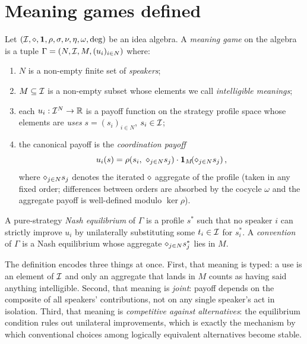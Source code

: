 \section{Meaning games defined}\label{sec:meaning-game-defined}

\begin{definition}\label{def:meaning-game}
Let $(\mathcal{I},\mathbin{\diamond},\mathbf{1},\rho,\sigma,\nu,\eta,\omega,\deg)$ be an
idea algebra. A \emph{meaning game} on the algebra is a tuple
$\Gamma=(N,\mathcal{I},M,(u_i)_{i\in N})$ where:
\begin{enumerate}[leftmargin=2em]
  \item $N$ is a non-empty finite set of \emph{speakers};
  \item $M\subseteq\mathcal{I}$ is a non-empty subset whose elements we call
    \emph{intelligible meanings};
  \item each $u_i:\mathcal{I}^N\to\mathbb{R}$ is a payoff function on the strategy
    profile space whose elements are \emph{uses} $s=(s_i)_{i\in N}$,
    $s_i\in\mathcal{I}$;
  \item the canonical payoff is the \emph{coordination payoff}
    \[
      u_i(s) = \rho\!\left(s_i,\ \diamond_{j\in N} s_j\right)
              \cdot \mathbf{1}_{M}\!\!\left(\diamond_{j\in N} s_j\right),
    \]
    where $\diamond_{j\in N} s_j$ denotes the iterated $\mathbin{\diamond}$
    aggregate of the profile (taken in any fixed order; differences
    between orders are absorbed by the cocycle $\omega$ and the
    aggregate payoff is well-defined modulo $\ker\rho$).
\end{enumerate}
\end{definition}

A pure-strategy \emph{Nash equilibrium} of $\Gamma$ is a profile $s^\ast$
such that no speaker $i$ can strictly improve $u_i$ by unilaterally
substituting some $t_i\in\mathcal{I}$ for $s^\ast_i$. A \emph{convention} of
$\Gamma$ is a Nash equilibrium whose aggregate
$\diamond_{j\in N} s^\ast_j$ lies in $M$.

The definition encodes three things at once. First, that meaning is
typed: a use is an element of $\mathcal{I}$ and only an aggregate that lands
in $M$ counts as having said anything intelligible. Second, that meaning
is \emph{joint}: payoff depends on the composite of all speakers'
contributions, not on any single speaker's act in isolation. Third,
that meaning is \emph{competitive against alternatives}: the equilibrium
condition rules out unilateral improvements, which is exactly the
mechanism by which conventional choices among logically equivalent
alternatives become stable.

